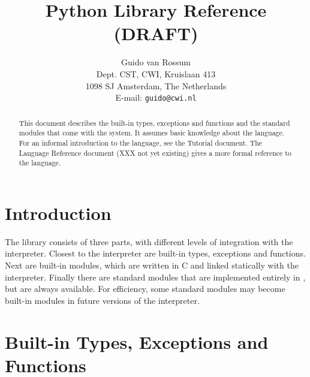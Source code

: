 

\sloppy

\title{\bf
	Python Library Reference \\
	(DRAFT)
}

\author{
	Guido van Rossum \\
	Dept. CST, CWI, Kruislaan 413 \\
	1098 SJ Amsterdam, The Netherlands \\
	E-mail: {\tt guido@cwi.nl}
}




\maketitle

\begin{abstract}

\noindent
This document describes the built-in types, exceptions and functions and
the standard modules that come with the {\Python} system.
It assumes basic knowledge about the {\Python} language.
For an informal introduction to the language, see the Tutorial document.
The Language Reference document (XXX not yet existing)
gives a more formal reference to the language.

\end{abstract}

\pagebreak

\tableofcontents

\pagebreak


\section{Introduction}

The {\Python} library consists of three parts, with different levels of
integration with the interpreter.
Closest to the interpreter are built-in types, exceptions and functions.
Next are built-in modules, which are written in C and linked statically
with the interpreter.
Finally there are standard modules that are implemented entirely in
{\Python}, but are always available.
For efficiency, some standard modules may become built-in modules in
future versions of the interpreter.

\section{Built-in Types, Exceptions and Functions}

